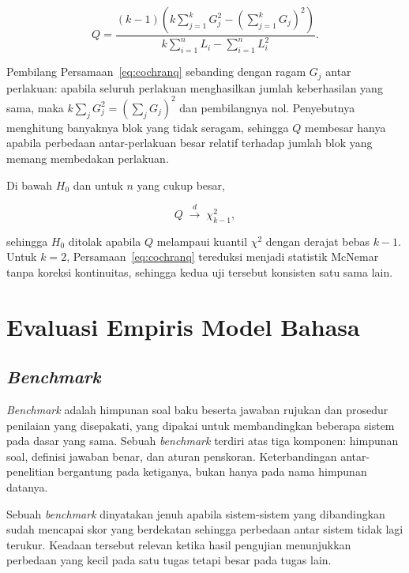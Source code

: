 \begin{equation}
    Q =
    \frac{(k-1)\left(k\sum_{j=1}^{k} G_j^2
          - \left(\sum_{j=1}^{k} G_j\right)^2\right)}
         {k\sum_{i=1}^{n} L_i - \sum_{i=1}^{n} L_i^2 } .
    \label{eq:cochranq}
\end{equation}

Pembilang Persamaan~\ref{eq:cochranq} sebanding dengan ragam $G_j$ antar
perlakuan: apabila seluruh perlakuan menghasilkan jumlah keberhasilan yang
sama, maka $k\sum_j G_j^2 = (\sum_j G_j)^2$ dan pembilangnya nol. Penyebutnya
menghitung banyaknya blok yang tidak seragam, sehingga $Q$ membesar hanya
apabila perbedaan antar-perlakuan besar relatif terhadap jumlah blok yang
memang membedakan perlakuan.

Di bawah $H_0$ dan untuk $n$ yang cukup besar,

\begin{equation}
    Q \;\xrightarrow{d}\; \chi^2_{k-1},
\end{equation}

sehingga $H_0$ ditolak apabila $Q$ melampaui kuantil $\chi^2$ dengan derajat
bebas $k-1$. Untuk $k=2$, Persamaan~\ref{eq:cochranq} tereduksi menjadi
statistik McNemar tanpa koreksi kontinuitas, sehingga kedua uji tersebut
konsisten satu sama lain.

\section{Evaluasi Empiris Model Bahasa}
\label{sec:evaluasi-llm}

\subsection{\textit{Benchmark}}

\textit{Benchmark} adalah himpunan soal baku beserta jawaban rujukan dan
prosedur penilaian yang disepakati, yang dipakai untuk membandingkan beberapa
sistem pada dasar yang sama. Sebuah \textit{benchmark} terdiri atas tiga
komponen: himpunan soal, definisi jawaban benar, dan aturan penskoran.
Keterbandingan antar-penelitian bergantung pada ketiganya, bukan hanya pada
nama himpunan datanya.

Sebuah \textit{benchmark} dinyatakan jenuh apabila sistem-sistem yang
dibandingkan sudah mencapai skor yang berdekatan sehingga perbedaan antar
sistem tidak lagi terukur. Keadaan tersebut relevan ketika hasil pengujian
menunjukkan perbedaan yang kecil pada satu tugas tetapi besar pada tugas lain.

